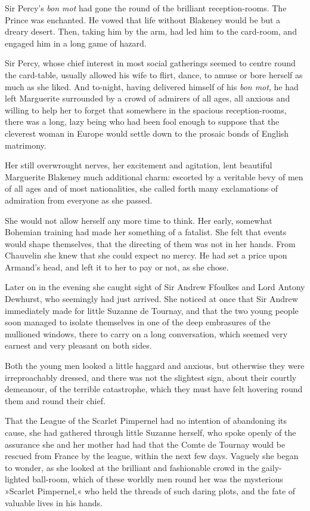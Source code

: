 Sir Percy's \textit{bon mot} had gone the round of the brilliant reception-rooms. The Prince was enchanted. He vowed that life without Blakeney would be but a dreary desert. Then, taking him by the arm, had led him to the card-room, and engaged him in a long game of hazard.

Sir Percy, whose chief interest in most social gatherings seemed to centre round the card-table, usually allowed his wife to flirt, dance, to amuse or bore herself as much as she liked. And to-night, having delivered himself of his \textit{bon mot}, he had left Marguerite surrounded by a crowd of admirers of all ages, all anxious and willing to help her to forget that somewhere in the spacious reception-rooms, there was a long, lazy being who had been fool enough to suppose that the cleverest woman in Europe would settle down to the prosaic bonds of English matrimony.

Her still overwrought nerves, her excitement and agitation, lent beautiful Marguerite Blakeney much additional charm: escorted by a veritable bevy of men of all ages and of most nationalities, she called forth many exclamations of admiration from everyone as she passed.

She would not allow herself any more time to think. Her early, somewhat Bohemian training had made her something of a fatalist. She felt that events would shape themselves, that the directing of them was not in her hands. From Chauvelin she knew that she could expect no mercy. He had set a price upon Armand's head, and left it to her to pay or not, as she chose.

Later on in the evening she caught sight of Sir Andrew Ffoulkes and Lord Antony Dewhurst, who seemingly had just arrived. She noticed at once that Sir Andrew immediately made for little Suzanne de Tournay, and that the two young people soon managed to isolate themselves in one of the deep embrasures of the mullioned windows, there to carry on a long conversation, which seemed very earnest and very pleasant on both sides.

Both the young men looked a little haggard and anxious, but otherwise they were irreproachably dressed, and there was not the slightest sign, about their courtly demeanour, of the terrible catastrophe, which they must have felt hovering round them and round their chief.

That the League of the Scarlet Pimpernel had no intention of abandoning its cause, she had gathered through little Suzanne herself, who spoke openly of the assurance she and her mother had had that the Comte de Tournay would be rescued from France by the league, within the next few days. Vaguely she began to wonder, as she looked at the brilliant and fashionable crowd in the gaily-lighted ball-room, which of these worldly men round her was the mysterious »Scarlet Pimpernel,« who held the threads of such daring plots, and the fate of valuable lives in his hands.

